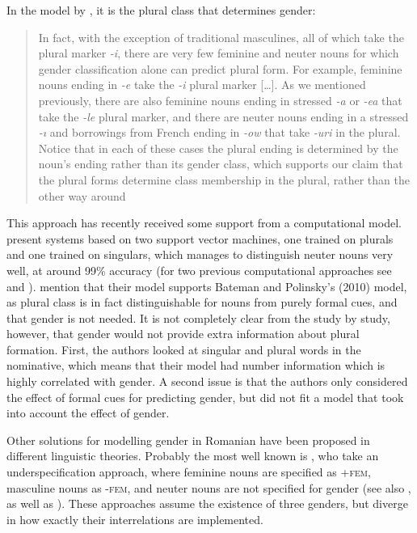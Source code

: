 In the model by \textcite{Bateman.2010}, it is the plural class that determines gender:

\begin{quotation}
  In fact, with the exception of traditional masculines, all of which take the plural marker \textit{-i}, there are very few feminine and neuter nouns for which gender classification alone can predict plural form. For example, feminine nouns ending in \textit{-e} take the \textit{-i} plural marker [\dots]. As we mentioned previously, there are also feminine nouns ending in stressed \textit{-a} or \textit{-ea} that take the \textit{-le} plural marker, and there are neuter nouns ending in a stressed \textit{-ı} and borrowings from French ending in \textit{-ow} that take \textit{-uri} in the plural. Notice that in each of these cases the plural ending is determined by the noun’s ending rather than its gender class, which supports our claim that the plural forms determine class membership in the plural, rather than the other way around \autocite[54]{Bateman.2010}
\end{quotation}

This approach has recently received some support from a computational model. \textcite{Dinu.2012} present systems based on two support vector machines, one trained on plurals and one trained on singulars, which manages to distinguish neuter nouns very well, at around 99\% accuracy (for two previous computational approaches see \citealt{Cucerzan.2003} and \citealt{Nastase.2009}). \textcite[123]{Dinu.2012} mention that their model supports Bateman and Polinsky's (2010) model, as plural class is in fact distinguishable for nouns from purely formal cues, and that gender is not needed. It is not completely clear from the study by \textcite{Dinu.2012} study, however, that gender would not provide extra information about plural formation. First, the authors looked at singular and plural words in the nominative, which means that their model had number information which is highly correlated with gender. A second issue is that the authors only considered the effect of formal cues for predicting gender, but did not fit a model that took into account the effect of gender.

Other solutions for modelling gender in Romanian have been proposed in different linguistic theories. Probably the most well known is \textcite{Farkas.1995}, who take an underspecification approach, where feminine nouns are specified as +\textsc{fem}, masculine nouns as -\textsc{fem}, and neuter nouns are not specified for gender (see also \citealt{Farkas.1990}, as well as \citealt{Sadler.2006, Wechsler.2008, Kramer.2015}). These approaches assume the existence of three genders, but diverge in how exactly their interrelations are implemented.

